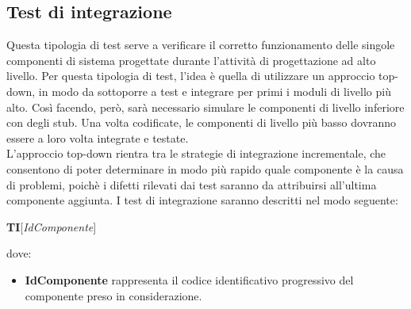 	\subsection{Test di integrazione}
	Questa tipologia di test serve a verificare il corretto funzionamento delle singole componenti di sistema progettate durante l'attività di progettazione ad alto livello. Per questa tipologia di test, l'idea è quella di utilizzare un approccio top-down, in modo da sottoporre a test e integrare per primi i moduli di livello più alto.
	Così facendo, però, sarà necessario simulare le componenti di livello inferiore con degli stub. Una volta codificate, le componenti di livello più basso dovranno essere a loro volta integrate e testate.\\
	L'approccio top-down rientra tra le strategie di integrazione incrementale, che consentono di poter determinare in modo più rapido quale componente è la causa di problemi, poichè i difetti rilevati dai test saranno da attribuirsi all'ultima componente aggiunta.
	I test di integrazione saranno descritti nel modo seguente:
	\begin{center}
		\textbf{TI}[\textit{IdComponente}]
	\end{center}
	dove:
	\begin{itemize}
		\item
		\textbf{IdComponente} rappresenta il codice identificativo progressivo del componente preso in considerazione.
	\end{itemize}
	
